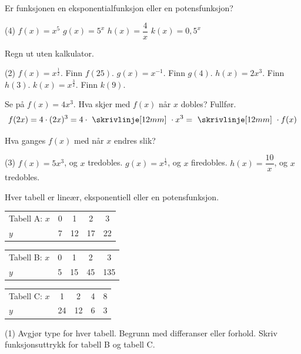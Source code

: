 
Er funksjonen en eksponentialfunksjon eller en potensfunksjon?
\begin{tasks}(4)
  \task $f(x) = x^5$
  \task $g(x) = 5^x$
  \task $h(x) = \dfrac{4}{x}$
  \task $k(x) = 0{,}5^x$
\end{tasks}

Regn ut uten kalkulator.
\begin{tasks}(2)
  \task $f(x) = x^{\tfrac12}$. Finn $f(25)$.
  \task $g(x) = x^{-1}$. Finn $g(4)$.
  \task $h(x) = 2x^3$. Finn $h(3)$.
  \task $k(x) = x^{\tfrac32}$. Finn $k(9)$.
\end{tasks}

Se på $f(x) = 4x^3$. Hva skjer med $f(x)$ når $x$ dobles? Fullfør.
\[ f(2x) = 4 \cdot (2x)^3 = 4 \cdot \ \skrivlinje[12mm] \ \cdot x^3 = \ \skrivlinje[12mm] \ \cdot f(x) \]


Hva ganges $f(x)$ med når $x$ endres slik?
\begin{tasks}(3)
  \task $f(x) = 5x^3$, og $x$ tredobles.
  \task $g(x) = x^{\tfrac12}$, og $x$ firedobles.
  \task $h(x) = \dfrac{10}{x}$, og $x$ tredobles.
\end{tasks}

Hver tabell er lineær, eksponentiell eller en potensfunksjon.
\begin{center}
\begin{tabular}{@{}l|cccc@{}}
Tabell A: $x$ & 0 & 1 & 2 & 3\\
$y$ & 7 & 12 & 17 & 22\\
\end{tabular}\qquad
\begin{tabular}{@{}l|cccc@{}}
Tabell B: $x$ & 0 & 1 & 2 & 3\\
$y$ & 5 & 15 & 45 & 135\\
\end{tabular}\qquad
\begin{tabular}{@{}l|cccc@{}}
Tabell C: $x$ & 1 & 2 & 4 & 8\\
$y$ & 24 & 12 & 6 & 3\\
\end{tabular}
\end{center}
\begin{tasks}(1)
  \task Avgjør type for hver tabell. Begrunn med differanser eller forhold.
  \task Skriv funksjonsuttrykk for tabell B og tabell C.
\end{tasks}

